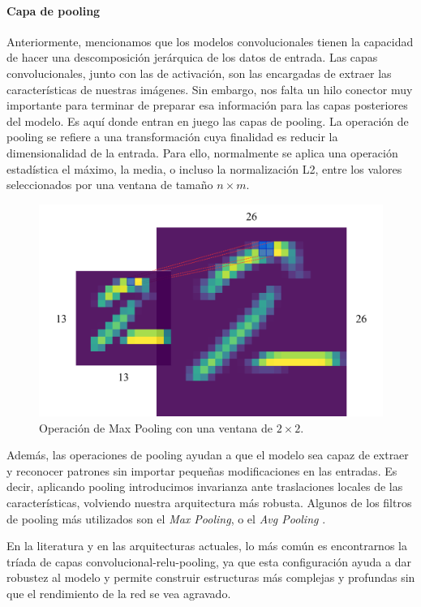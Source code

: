 \paragraph{Capa de pooling}

Anteriormente, mencionamos que los modelos convolucionales tienen la capacidad de hacer una descomposición jerárquica de los datos de entrada. Las capas convolucionales, junto con las de activación, son las encargadas de extraer las características de nuestras imágenes. Sin embargo, nos falta un hilo conector muy importante para terminar de preparar esa información para las capas posteriores del modelo. Es aquí donde entran en juego las capas de pooling. La operación de pooling se refiere a una transformación cuya finalidad es reducir la dimensionalidad de la entrada. Para ello, normalmente se aplica una operación estadística el máximo, la media, o incluso la normalización L2, entre los valores seleccionados por una ventana de tamaño $n \times m$.

\begin{figure}[ht]
	\centering
	\includegraphics[width=0.8\linewidth]{figures/ejemplos/pooling_2d.png}
	\caption{Operación de Max Pooling con una ventana de $2\times2$.}
	\label{fig:pooling_2d}
\end{figure}

Además, las operaciones de pooling ayudan a que el modelo sea capaz de extraer y reconocer patrones sin importar pequeñas modificaciones en las entradas. Es decir, aplicando pooling introducimos invarianza ante traslaciones locales de las características, volviendo nuestra arquitectura más robusta. Algunos de los filtros de pooling más utilizados son el \textit{Max Pooling}, o el \textit{Avg Pooling} \cite{dl__goodfellow_2016}.

En la literatura y en las arquitecturas actuales, lo más común es encontrarnos la tríada de capas convolucional-relu-pooling, ya que esta configuración ayuda a dar robustez al modelo y permite construir estructuras más complejas y profundas sin que el rendimiento de la red se vea agravado.

